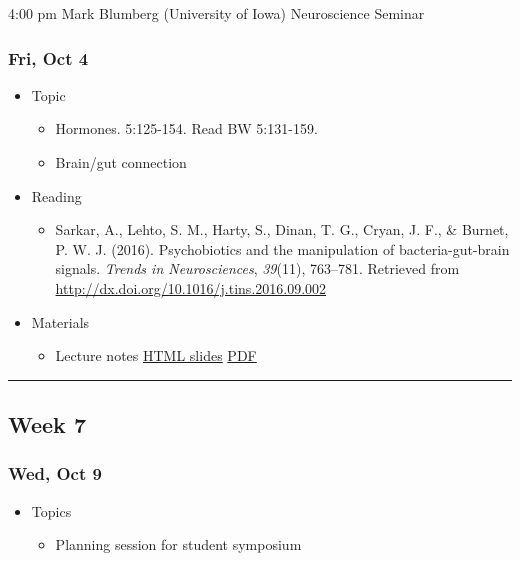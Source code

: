 \documentclass[]{article}
\providecommand{\tightlist}{%
  \setlength{\itemsep}{0pt}\setlength{\parskip}{0pt}}
\begin{document}
4:00 pm Mark Blumberg (University of Iowa) Neuroscience Seminar

\hypertarget{fri-oct-4}{%
\subsubsection{Fri, Oct 4}\label{fri-oct-4}}

\begin{itemize}
\tightlist
\item
  Topic

  \begin{itemize}
  \tightlist
  \item
    Hormones. 5:125-154. Read BW 5:131-159.
  \item
    Brain/gut connection
  \end{itemize}
\item
  Reading

  \begin{itemize}
  \tightlist
  \item
    Sarkar, A., Lehto, S. M., Harty, S., Dinan, T. G., Cryan, J. F., \&
    Burnet, P. W. J. (2016). Psychobiotics and the manipulation of
    bacteria-gut-brain signals. \emph{Trends in Neurosciences},
    \emph{39}(11), 763--781. Retrieved from
    \url{http://dx.doi.org/10.1016/j.tins.2016.09.002}
  \end{itemize}
\item
  Materials

  \begin{itemize}
  \tightlist
  \item
    Lecture notes \textbar{} \href{}{HTML slides} \textbar{}
    \href{}{PDF}
  \end{itemize}
\end{itemize}

\begin{center}\rule{0.5\linewidth}{\linethickness}\end{center}

\hypertarget{week-7}{%
\subsection{Week 7}\label{week-7}}

\hypertarget{wed-oct-9}{%
\subsubsection{Wed, Oct 9}\label{wed-oct-9}}

\begin{itemize}
\tightlist
\item
  Topics

  \begin{itemize}
  \tightlist
  \item
    Planning session for student symposium
  \end{itemize}
\end{itemize}
\end{document}
